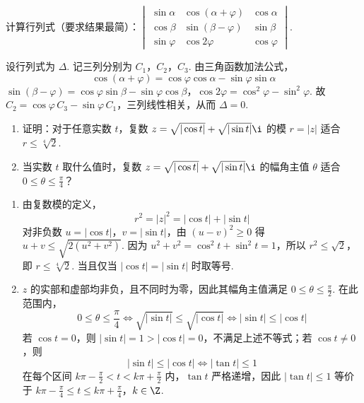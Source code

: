 \begin{problem}
计算行列式（要求结果最简）：\(\begin{vmatrix}\sin \alpha & \cos \left(\alpha + \varphi\right) & \cos \alpha \\ \cos \beta & \sin \left(\beta - \varphi\right) & \sin \beta \\ \sin \varphi & \cos 2 \varphi & \cos \varphi\end{vmatrix}\).

\begin{solution}
设行列式为 \(\Delta\). 记三列分别为 \(C_{1}\)，\(C_{2}\)，\(C_{3}\). 由三角函数加法公式，
\[
\cos(\alpha+\varphi)=\cos\varphi\cos\alpha-\sin\varphi\sin\alpha
\]
\(\sin(\beta-\varphi)=\cos\varphi\sin\beta-\sin\varphi\cos\beta\)，\(\cos2\varphi=\cos^{2}\varphi-\sin^{2}\varphi\).
故 \(C_{2}=\cos\varphi\,C_{3}-\sin\varphi\,C_{1}\)，三列线性相关，从而 \(\Delta=0\).
\end{solution}
\end{problem}

\begin{problem}
\begin{enumerate}
\item 证明：对于任意实数 \(t\)，复数 \(z = \sqrt{|\cos t|} + \sqrt{|\sin t|}\i\) 的模 \(r = |z|\) 适合 \(r \leqslant \sqrt[4]{2}\).
\item 当实数 \(t\) 取什么值时，复数 \(z = \sqrt{|\cos t|} + \sqrt{|\sin t|}\i\) 的幅角主值 \(\theta\) 适合 \(0 \leqslant \theta \leqslant \frac{\pi}{4}\)？
\end{enumerate}

\begin{solution}
\begin{enumerate}
\item 由复数模的定义，
\[
r^{2}=|z|^{2}=|\cos t|+|\sin t|
\]
对非负数 \(u=|\cos t|\)，\(v=|\sin t|\)，由 \((u-v)^{2}\geqslant0\) 得 \(u+v\leqslant\sqrt{2(u^{2}+v^{2})}\). 因为 \(u^{2}+v^{2}=\cos^{2}t+\sin^{2}t=1\)，所以 \(r^{2}\leqslant\sqrt{2}\)，即 \(r\leqslant\sqrt[4]{2}\). 当且仅当 \(|\cos t|=|\sin t|\) 时取等号.
\item \(z\) 的实部和虚部均非负，且不同时为零，因此其幅角主值满足 \(0\leqslant\theta\leqslant\frac{\pi}{2}\). 在此范围内，
\[
0\leqslant\theta\leqslant\frac{\pi}{4}\iff \sqrt{|\sin t|}\leqslant\sqrt{|\cos t|}\iff |\sin t|\leqslant|\cos t|
\]
若 \(\cos t=0\)，则 \(|\sin t|=1>|\cos t|=0\)，不满足上述不等式；若 \(\cos t\neq0\)，则
\[
|\sin t|\leqslant|\cos t|\iff |\tan t|\leqslant1
\]
在每个区间 \(k\pi-\frac{\pi}{2}<t<k\pi+\frac{\pi}{2}\) 内，\(\tan t\) 严格递增，因此 \(|\tan t|\leqslant1\) 等价于
\(k\pi-\frac{\pi}{4}\leqslant t\leqslant k\pi+\frac{\pi}{4}\)，\(k\in\Z\).
\end{enumerate}
\end{solution}
\end{problem}

